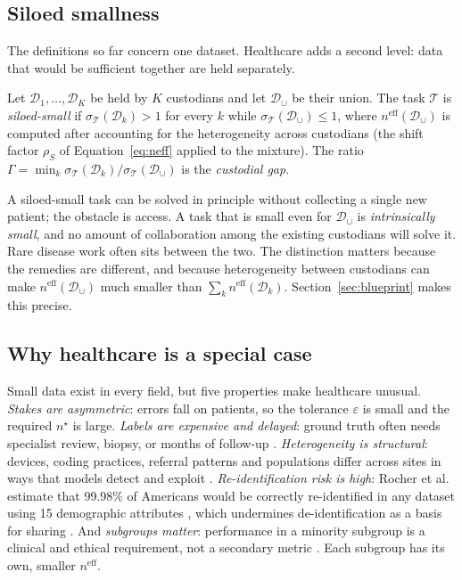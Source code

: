 \documentclass[acmsmall,screen,review]{acmart}
\newcommand{\eff}{\mathrm{eff}}
\theoremstyle{acmdefinition}
\begin{document}
\subsection{Siloed smallness}

The definitions so far concern one dataset. Healthcare adds a second level: data that would be sufficient together are held separately.

\begin{definition}\label{def:siloed}
Let $\mathcal{D}_1,\dots,\mathcal{D}_K$ be held by $K$ custodians and let $\mathcal{D}_{\cup}$ be their union. The task $\mathcal{T}$ is \emph{siloed-small} if $\sigma_{\mathcal{T}}(\mathcal{D}_k)>1$ for every $k$ while $\sigma_{\mathcal{T}}(\mathcal{D}_{\cup})\le 1$, where $n^{\eff}(\mathcal{D}_{\cup})$ is computed after accounting for the heterogeneity across custodians (the shift factor $\rho_S$ of Equation~\eqref{eq:neff} applied to the mixture). The ratio $\Gamma=\min_k \sigma_{\mathcal{T}}(\mathcal{D}_k)/\sigma_{\mathcal{T}}(\mathcal{D}_{\cup})$ is the \emph{custodial gap}.
\end{definition}

A siloed-small task can be solved in principle without collecting a single new patient; the obstacle is access. A task that is small even for $\mathcal{D}_{\cup}$ is \emph{intrinsically small}, and no amount of collaboration among the existing custodians will solve it. Rare disease work often sits between the two. The distinction matters because the remedies are different, and because heterogeneity between custodians can make $n^{\eff}(\mathcal{D}_{\cup})$ much smaller than $\sum_k n^{\eff}(\mathcal{D}_k)$. Section~\ref{sec:blueprint} makes this precise.

\subsection{Why healthcare is a special case}

Small data exist in every field, but five properties make healthcare unusual. \emph{Stakes are asymmetric}: errors fall on patients, so the tolerance $\varepsilon$ is small and the required $n^{\star}$ is large. \emph{Labels are expensive and delayed}: ground truth often needs specialist review, biopsy, or months of follow-up \cite{willemink2020preparing}. \emph{Heterogeneity is structural}: devices, coding practices, referral patterns and populations differ across sites in ways that models detect and exploit \cite{finlayson2021clinician,gichoya2022ai,zech2018variable}. \emph{Re-identification risk is high}: Rocher et al. estimate that 99.98\% of Americans would be correctly re-identified in any dataset using 15 demographic attributes \cite{rocher2019estimating}, which undermines de-identification as a basis for sharing \cite{price2019privacy,sweeney2002k}. And \emph{subgroups matter}: performance in a minority subgroup is a clinical and ethical requirement, not a secondary metric \cite{chen2021ethical,obermeyer2019dissecting}. Each subgroup has its own, smaller $n^{\eff}$.
\end{document}
